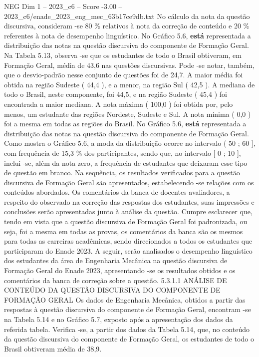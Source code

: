 \begin{textsample}{NEG Dim 1 – 2023\_c6 – Score -3.00 – 2023\_c6/enade\_2023\_eng\_mec\_63b17ce9db.txt}
No cálculo da nota da questão discursiva, consideram -se 80 \% relativos à nota da correção de conteúdo e 20 \% referentes à nota de desempenho linguístico.
No Gráfico 5.6, \textbf{está} representada a distribuição das notas na questão discursiva do componente de Formação Geral.
Na Tabela 5.13, observa -se que os estudantes de todo o Brasil obtiveram, em Formação Geral, média de 43,6 nas questões discursivas.
Pode -se notar, também, que o desvio-padrão nesse conjunto de questões foi de 24,7.
A maior média foi obtida na região Sudeste ( 44,4 ), e a menor, na região Sul ( 42,5 ).
A mediana de todo o Brasil, neste componente, foi 44,5, e na região Sudeste ( 45,4 ) foi encontrada a maior mediana.
A nota máxima ( 100,0 ) foi obtida por, pelo menos, um estudante das regiões Nordeste, Sudeste e Sul.
A nota mínima ( 0,0 ) foi a mesma em todas as regiões do Brasil.
No Gráfico 5.6, \textbf{está} representada a distribuição das notas na questão discursiva do componente de Formação Geral.
Como mostra o Gráfico 5.6, a moda da distribuição ocorre no intervalo ( 50 ; 60 ], com frequência de 15,3 \% dos participantes, sendo que, no intervalo [ 0 ; 10 ], inclui -se, além da nota zero, a frequência de estudantes que deixaram esse tipo de questão em branco.
Na sequência, os resultados verificados para a questão discursiva de Formação Geral são apresentados, estabelecendo -se relações com os conteúdos abordados.
Os comentários da banca de docentes avaliadores, a respeito do observado na correção das respostas dos estudantes, suas impressões e conclusões serão apresentadas junto à análise da questão.
Cumpre esclarecer que, tendo em vista que a questão discursiva de Formação Geral foi padronizada, ou seja, foi a mesma em todas as provas, os comentários da banca são os mesmos para todas as carreiras acadêmicas, sendo direcionados a todos os estudantes que participaram do Enade 2023.
A seguir, serão analisados o desempenho linguístico dos estudantes da área de Engenharia Mecânica na questão discursiva de Formação Geral do Enade 2023, apresentando -se os resultados obtidos e os comentários da banca de correção sobre a questão. 5.3.1.1 ANÁLISE DE CONTEÚDO DA QUESTÃO DISCURSIVA DO COMPONENTE DE FORMAÇÃO GERAL Os dados de Engenharia Mecânica, obtidos a partir das respostas à questão discursiva do componente de Formação Geral, encontram -se na Tabela 5.14 e no Gráfico 5.7, exposto após a apresentação dos dados da referida tabela.
Verifica -se, a partir dos dados da Tabela 5.14, que, no conteúdo da questão discursiva do componente de Formação Geral, os estudantes de todo o Brasil obtiveram média de 38,9.

\end{textsample}
